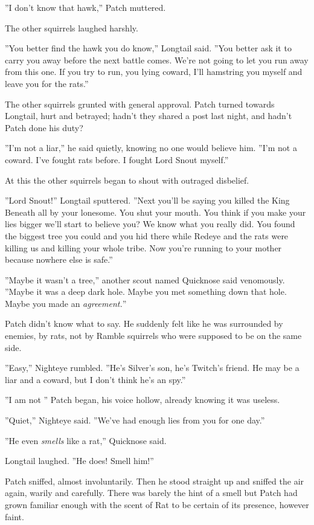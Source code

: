 \documentclass[12pt]{book}
\begin{document}
''I don't know that hawk,'' Patch muttered.

The other squirrels laughed harshly.

''You better find the hawk you do know,'' Longtail said. ''You better ask it to carry you away before the next battle comes. We're not going to let you run away from this one. If you try to run, you lying coward, I'll hamstring you myself and leave you for the rats.''

The other squirrels grunted with general approval. Patch turned towards Longtail, hurt and betrayed; hadn't they shared a post last night, and hadn't Patch done his duty?

''I'm not a liar,'' he said quietly, knowing no one would believe him. ''I'm not a coward. I've fought rats before. I fought Lord Snout myself.''

At this the other squirrels began to shout with outraged disbelief.

''Lord Snout!'' Longtail sputtered. ''Next you'll be saying you killed the King Beneath all by your lonesome. You shut your mouth. You think if you make your lies bigger we'll start to believe you? We know what you really did. You found the biggest tree you could and you hid there while Redeye and the rats were killing us and killing your whole tribe. Now you're running to your mother because nowhere else is safe.''

''Maybe it wasn't a tree,'' another scout named Quicknose said venomously. ''Maybe it was a deep dark hole. Maybe you met something down that hole. Maybe you made an {\it agreement.}''

Patch didn't know what to say. He suddenly felt like he was surrounded by enemies, by rats, not by Ramble squirrels who were supposed to be on the same side.

''Easy,'' Nighteye rumbled. ''He's Silver's son, he's Twitch's friend. He may be a liar and a coward, but I don't think he's an spy.''

''I am not %
'' Patch began, his voice hollow, already knowing it was useless.

''Quiet,'' Nighteye said. ''We've had enough lies from you for one day.''

''He even {\it smells} like a rat,'' Quicknose said.

Longtail laughed. ''He does! Smell him!''

Patch sniffed, almost involuntarily. Then he stood straight up and sniffed the air again, warily and carefully. There was barely the hint of a smell %
but Patch had grown familiar enough with the scent of Rat to be certain of its presence, however faint.
\end{document}
